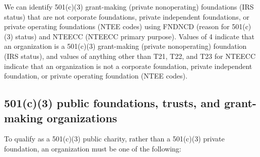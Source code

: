 \documentclass[
  letterpaper,
  DIV=11,
  numbers=noendperiod]{scrreprt}
\begin{document}
We can identify 501(c)(3) grant-making (private nonoperating)
foundations (IRS status) that are not corporate foundations, private
independent foundations, or private operating foundations (NTEE codes)
using FNDNCD (reason for 501(c)(3) status) and NTEECC (NTEECC primary
purpose). Values of 4 indicate that an organization is a 501(c)(3)
grant-making (private nonoperating) foundation (IRS status), and values
of anything other than T21, T22, and T23 for NTEECC indicate that an
organization is not a corporate foundation, private independent
foundation, or private operating foundation (NTEE codes).

\hypertarget{c3-public-foundations-trusts-and-grant-making-organizations}{%
\subsection{501(c)(3) public foundations, trusts, and grant-making
organizations}\label{c3-public-foundations-trusts-and-grant-making-organizations}}

To qualify as a 501(c)(3) public charity, rather than a 501(c)(3)
private foundation, an organization must be one of the following:
\end{document}
